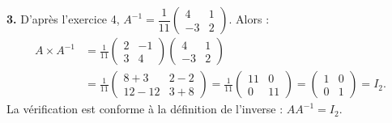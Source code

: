 \documentclass[11pt]{article}
\begin{document}
\begin{corrige}
\textbf{3.} D'après l'exercice 4, $A^{-1} = \dfrac{1}{11}\begin{pmatrix} 4 & 1 \\ -3 & 2 \end{pmatrix}$. Alors :
\begin{align*}
A \times A^{-1} &= \frac{1}{11}\begin{pmatrix} 2 & -1 \\ 3 & 4 \end{pmatrix}\begin{pmatrix} 4 & 1 \\ -3 & 2 \end{pmatrix} \\
&= \frac{1}{11}\begin{pmatrix} 8 + 3 & 2 - 2 \\ 12 - 12 & 3 + 8 \end{pmatrix}
= \frac{1}{11}\begin{pmatrix} 11 & 0 \\ 0 & 11 \end{pmatrix}
= \begin{pmatrix} 1 & 0 \\ 0 & 1 \end{pmatrix} = I_2.
\end{align*}
La vérification est conforme à la définition de l'inverse : $A A^{-1} = I_2$.
\end{corrige}
\end{document}
